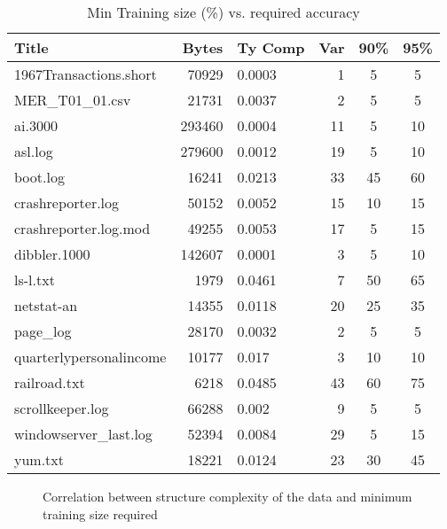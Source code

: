 \begin{table}
\begin{center}
\begin{tabular}{|l|r|l|r|c|c|} \hline
Title 			& Bytes 	& Ty Comp	& Var	& 90\% 		& 95\% \\ \hline \hline
1967Transactions.short	& 70929		& 0.0003	& 1 		& 5		& 5 \\ \hline
MER\_T01\_01.csv        & 21731 	& 0.0037	& 2		& 5		& 5 \\ \hline
ai.3000                 & 293460 	& 0.0004	& 11		& 5		& 10 \\ \hline
asl.log                 & 279600	& 0.0012	& 19		& 5		& 10\\ \hline
boot.log                & 16241		& 0.0213	& 33		& 45		& 60\\ \hline
crashreporter.log       & 50152 	& 0.0052	& 15		& 10		& 15\\ \hline
crashreporter.log.mod   & 49255		& 0.0053	& 17		& 5		& 15\\ \hline
dibbler.1000            & 142607 	& 0.0001	& 3		& 5		& 10 \\ \hline
ls-l.txt                & 1979		& 0.0461	& 7		& 50		& 65 \\ \hline
netstat-an              & 14355		& 0.0118	& 20		& 25		& 35\\ \hline
page\_log               & 28170		& 0.0032	& 2		& 5		& 5\\ \hline
quarterlypersonalincome & 10177		& 0.017		& 3		& 10		& 10\\ \hline
railroad.txt            & 6218		& 0.0485	& 43		& 60		& 75\\ \hline
scrollkeeper.log        & 66288		& 0.002		& 9		& 5		& 5\\ \hline
windowserver\_last.log  & 52394		& 0.0084	& 29		& 5		& 15\\ \hline
yum.txt                 & 18221		& 0.0124	& 23		& 30		& 45\\ \hline
\end{tabular}
\caption{Min Training size (\%) vs. required accuracy}
\end{center}
\end{table}

\begin{figure}
\begin{center}
\caption{Correlation between structure complexity of 
the data and minimum training size required}
\end{center}
\end{figure}
